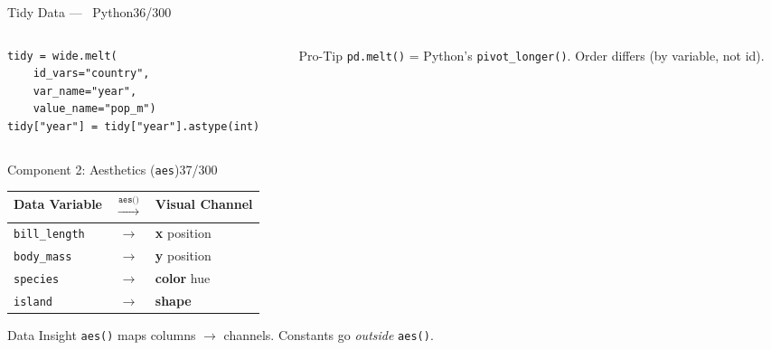\documentclass[10pt]{beamer}
\newcommand{\Python}{\textcolor{PyAccent}{\faPython~Python}}
\newcommand{\smark}[1]{\hfill{\scriptsize\color{codegray}#1}}
\begin{document}
\begin{frame}[fragile]{Tidy Data --- \Python}\smark{36/300}
\begin{columns}[T]
\begin{column}{0.55\textwidth}
\begin{lstlisting}[style=Pystyle]
tidy = wide.melt(
    id_vars="country",
    var_name="year",
    value_name="pop_m")
tidy["year"] = tidy["year"].astype(int)
\end{lstlisting}
\end{column}
\begin{column}{0.42\textwidth}
\begin{alertblock}{Pro-Tip}
    \scriptsize \texttt{pd.melt()} = Python's \texttt{pivot\_longer()}. Order differs (by variable, not id).
\end{alertblock}
\end{column}
\end{columns}
\end{frame}

\begin{frame}{Component 2: Aesthetics (\texttt{aes})}\smark{37/300}
\centering\small
\begin{tabular}{@{}lcl@{}}
    \toprule
    \textbf{Data Variable} & $\xrightarrow{\texttt{aes()}}$ & \textbf{Visual Channel} \\
    \midrule
    \texttt{bill\_length} & $\to$ & \textbf{x} position \\
    \texttt{body\_mass}   & $\to$ & \textbf{y} position \\
    \texttt{species}      & $\to$ & \textbf{color} hue \\
    \texttt{island}       & $\to$ & \textbf{shape} \\
    \bottomrule
\end{tabular}
\vspace{0.3cm}
\begin{exampleblock}{Data Insight}
    \scriptsize \texttt{aes()} maps columns $\to$ channels. Constants go \emph{outside} \texttt{aes()}.
\end{exampleblock}
\end{frame}
\end{document}
